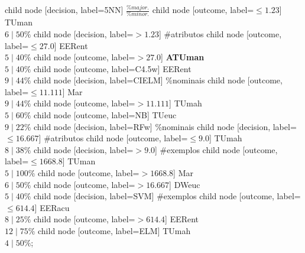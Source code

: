 child {node [decision, label=5NN] {$\frac{\%major.}{\%minor.}$}
child {node [outcome, label=$\leq1.23$] {TUman \\$6\mid50\%$}}
child {node [decision, label=$>1.23$] {\#atributos}
child {node [outcome, label=$\leq27.0$] {EERent \\$5\mid40\%$}}
child {node [outcome, label=$>27.0$] {\textbf{ATUman} \\$5\mid40\%$}}}}
child {node [outcome, label=C4.5w] {EERent \\$9\mid44\%$}}
child {node [decision, label=CIELM] {\%nominais}
child {node [outcome, label=$\leq11.111$] {Mar \\$9\mid44\%$}}
child {node [outcome, label=$>11.111$] {TUmah \\$5\mid60\%$}}}
child {node [outcome, label=NB] {TUeuc \\$9\mid22\%$}}
child {node [decision, label=RFw] {\%nominais}
child {node [decision, label=$\leq16.667$] {\#atributos}
child {node [outcome, label=$\leq9.0$] {TUmah \\$8\mid38\%$}}
child {node [decision, label=$>9.0$] {\#exemplos}
child {node [outcome, label=$\leq1668.8$] {TUman \\$5\mid100\%$}}
child {node [outcome, label=$>1668.8$] {Mar \\$6\mid50\%$}}}}
child {node [outcome, label=$>16.667$] {DWeuc \\$5\mid40\%$}}}
child {node [decision, label=SVM] {\#exemplos}
child {node [outcome, label=$\leq614.4$] {EERacu \\$8\mid25\%$}}
child {node [outcome, label=$>614.4$] {EERent \\$12\mid75\%$}}}
child {node [outcome, label=ELM] {TUmah \\$4\mid50\%$}};